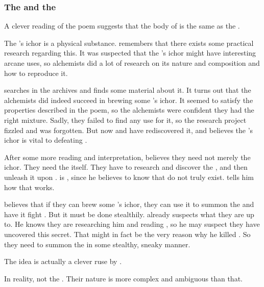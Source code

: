\subsubsection{The \chimaera and the \malgryph}
A clever reading of the poem suggests that the body of \Zaz is the same as the . 

The \Chimaera's ichor is a physical substance.
\Urizeth remembers that there exists some practical research regarding this.
It was suspected that the \Chimaera's ichor might have interesting arcane uses, so alchemists did a lot of research on its nature and composition and how to reproduce it.

\Urizeth searches in the archives and finds some material about it.
It turns out that the alchemists did indeed succeed in brewing some \Chimaera's ichor.
It seemed to satisfy the properties described in the poem, so the alchemists were confident they had the right mixture.
Sadly, they failed to find any use for it, so the research project fizzled and was forgotten.
But now \Urizeth and \Teshrial have rediscovered it, and \Urizeth believes the \Chimaera's ichor is vital to defeating \Ishnaruchaefir.

After some more reading and interpretation, \Urizeth believes they need not merely the ichor.
They need the \malgryph itself.
They have to research and discover the , and then unleash it upon \Ishnaruchaefir.
\Teshrial is \skeptical, since he believes to know that \malgryphs do not truly exist. 
\Urizeth tells him how that works. 

\Urizeth believes that if they can brew some \Chimaera's ichor, they can use it to summon the \malgryph and have it fight \Ishnaruchaefir.
But it must be done stealthily. 
\Ishnaruchaefir already suspects what they are up to.
He knows they are researching him and reading \WanderersInDarknessEmph, so he may suspect they have uncovered this secret. 
That might in fact be the very reason why he killed \Urizeth.
So they need to summon the \malgryph in some stealthy, sneaky manner. 





The \malgryph idea is actually a clever ruse by \Ishnaruchaefir. 

In reality,   not the \malgryph. 
Their nature is more complex and ambiguous than that.

